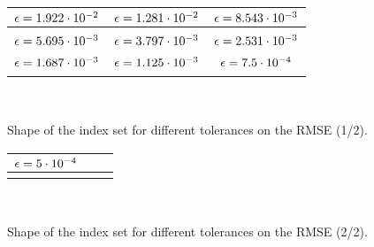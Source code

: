 
\begin{figure}[h]
\centering
\setlength{\figureheight}{0.3\textwidth}
\setlength{\figurewidth}{0.3\textwidth}
\begin{tabular}{ccc} \toprule
$\epsilon = \pgfmathprintnumber[/pgf/number format/sci,precision=3,fixed zerofill]{1.922e-02}$ & $\epsilon = \pgfmathprintnumber[/pgf/number format/sci,precision=3,fixed zerofill]{1.281e-02}$ & $\epsilon = \pgfmathprintnumber[/pgf/number format/sci,precision=3,fixed zerofill]{8.543e-03}$\\ \midrule 
  &  & \\ 
 \toprule
$\epsilon = \pgfmathprintnumber[/pgf/number format/sci,precision=3,fixed zerofill]{5.695e-03}$ & $\epsilon = \pgfmathprintnumber[/pgf/number format/sci,precision=3,fixed zerofill]{3.797e-03}$ & $\epsilon = \pgfmathprintnumber[/pgf/number format/sci,precision=3,fixed zerofill]{2.531e-03}$\\ \midrule 
  &  & \\ 
 \toprule
$\epsilon = \pgfmathprintnumber[/pgf/number format/sci,precision=3,fixed zerofill]{1.687e-03}$ & $\epsilon = \pgfmathprintnumber[/pgf/number format/sci,precision=3,fixed zerofill]{1.125e-03}$ & $\epsilon = \pgfmathprintnumber[/pgf/number format/sci,precision=3,fixed zerofill]{7.500e-04}$\\ \midrule 
  &  & \\ 

\end{tabular}\\

\caption{\label{fig:index_set}Shape of the index set for different tolerances on the RMSE (1/2).}
\end{figure}

\begin{figure}[h]
\centering
\setlength{\figureheight}{0.3\textwidth}
\setlength{\figurewidth}{0.3\textwidth}
\begin{tabular}{ccc} \toprule
$\epsilon = \pgfmathprintnumber[/pgf/number format/sci,precision=3,fixed zerofill]{5.000e-04}$ & &\\ \midrule 
  & &\\ 

\end{tabular}\\

\caption{\label{fig:index_set}Shape of the index set for different tolerances on the RMSE (2/2).}
\end{figure}
